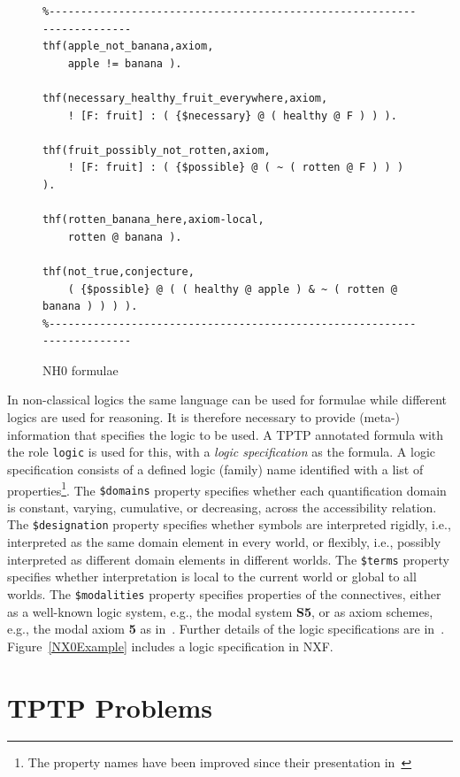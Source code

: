 \documentclass{ceurart}
\begin{document}
\begin{figure}[h!]
\small
{}
\begin{verbatim}
%------------------------------------------------------------------------
thf(apple_not_banana,axiom,
    apple != banana ).

thf(necessary_healthy_fruit_everywhere,axiom,
    ! [F: fruit] : ( {$necessary} @ ( healthy @ F ) ) ).

thf(fruit_possibly_not_rotten,axiom,
    ! [F: fruit] : ( {$possible} @ ( ~ ( rotten @ F ) ) ) ).

thf(rotten_banana_here,axiom-local,
    rotten @ banana ).

thf(not_true,conjecture,
    ( {$possible} @ ( ( healthy @ apple ) & ~ ( rotten @ banana ) ) ) ).
%------------------------------------------------------------------------
\end{verbatim}
\caption{NH0 formulae}
\label{NH0Example}
\end{figure}

In non-classical logics the same language can be used for formulae while different logics are 
used for reasoning.
It is therefore necessary to provide \mbox{(meta-)} information that specifies the
logic to be used.
A TPTP annotated formula with the role \texttt{logic} is used for this, with a {\em logic 
specification} as the formula.
A logic specification consists of a defined logic (family) name identified with a list of 
properties\footnote{%
The property names have been improved since their presentation in~\cite{SF+22}}.
The {\tt \$domains} property specifies whether each quantification domain is constant, varying,
cumulative, or decreasing, across the accessibility relation.
The {\tt \$designation} property specifies whether symbols are interpreted rigidly, i.e., 
interpreted as the same domain element in every world, or flexibly, i.e., possibly interpreted 
as different domain elements in different worlds. 
The {\tt \$terms} property specifies whether interpretation is local to the current world or
global to all worlds.
The {\tt \$modalities} property specifies properties of the connectives, either as a well-known 
logic system, e.g., the modal system {\bf S5}, or as axiom schemes, e.g., the modal axiom {\bf 5} 
as in~\cite{Gar18}.
Further details of the logic specifications are in~\cite{SF+22}.
Figure~\ref{NX0Example} includes a logic specification in NXF.

\section{TPTP Problems}
\label{TPTP}
\end{document}
